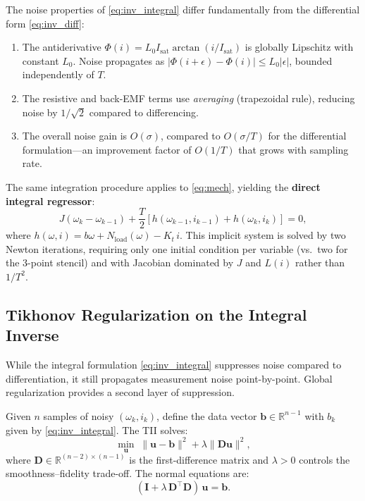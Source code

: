 \documentclass[lettersize,journal]{IEEEtran}
\begin{document}
The noise properties of \eqref{eq:inv_integral} differ fundamentally from the differential form \eqref{eq:inv_diff}:

\begin{enumerate}
    \item The antiderivative $\Phi(i) = L_0 I_{\text{sat}} \arctan(i/I_{\text{sat}})$ is globally Lipschitz with constant $L_0$. Noise propagates as $|\Phi(i+\epsilon) - \Phi(i)| \leq L_0|\epsilon|$, bounded independently of $T$.
    
    \item The resistive and back-EMF terms use \emph{averaging} (trapezoidal rule), reducing noise by $1/\sqrt{2}$ compared to differencing.
    
    \item The overall noise gain is $O(\sigma)$, compared to $O(\sigma/T)$ for the differential formulation---an improvement factor of $O(1/T)$ that grows with sampling rate.
\end{enumerate}

The same integration procedure applies to \eqref{eq:mech}, yielding the \textbf{direct integral regressor}:
\begin{equation}
\label{eq:direct_integral}
J(\omega_k - \omega_{k-1}) + \frac{T}{2}[h(\omega_{k-1}, i_{k-1}) + h(\omega_k, i_k)] = 0,
\end{equation}
where $h(\omega, i) = b\omega + N_{\text{load}}(\omega) - K_t\,i$. This implicit system is solved by two Newton iterations, requiring only one initial condition per variable (vs.\ two for the 3-point stencil) and with Jacobian dominated by $J$ and $L(i)$ rather than $1/T^2$.

\subsection{Tikhonov Regularization on the Integral Inverse}

While the integral formulation \eqref{eq:inv_integral} suppresses noise compared to differentiation, it still propagates measurement noise point-by-point. Global regularization provides a second layer of suppression.

Given $n$ samples of noisy $(\omega_k, i_k)$, define the data vector $\mathbf{b} \in \mathbb{R}^{n-1}$ with $b_k$ given by \eqref{eq:inv_integral}. The TII solves:
\begin{equation}
\label{eq:tii}
\min_{\mathbf{u}} \;\|\mathbf{u} - \mathbf{b}\|^2 + \lambda \|\mathbf{D}\mathbf{u}\|^2,
\end{equation}
where $\mathbf{D} \in \mathbb{R}^{(n-2)\times(n-1)}$ is the first-difference matrix and $\lambda > 0$ controls the smoothness--fidelity trade-off. The normal equations are:
\begin{equation}
\label{eq:normal}
(\mathbf{I} + \lambda\,\mathbf{D}^\top \mathbf{D})\,\mathbf{u} = \mathbf{b}.
\end{equation}
\end{document}
